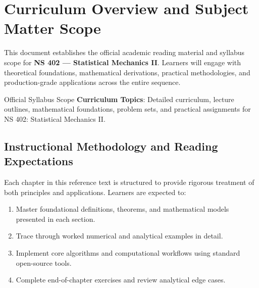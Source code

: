 \section{Curriculum Overview and Subject Matter Scope}

This document establishes the official academic reading material and syllabus scope for \textbf{NS 402 --- Statistical Mechanics II}. Learners will engage with theoretical foundations, mathematical derivations, practical methodologies, and production-grade applications across the entire sequence.

\begin{InsightBox}{Official Syllabus Scope}
  \textbf{Curriculum Topics}: Detailed curriculum, lecture outlines, mathematical foundations, problem sets, and practical assignments for NS 402: Statistical Mechanics II.
\end{InsightBox}

\subsection{Instructional Methodology and Reading Expectations}

Each chapter in this reference text is structured to provide rigorous treatment of both principles and applications. Learners are expected to:
\begin{enumerate}
  \item Master foundational definitions, theorems, and mathematical models presented in each section.
  \item Trace through worked numerical and analytical examples in detail.
  \item Implement core algorithms and computational workflows using standard open-source tools.
  \item Complete end-of-chapter exercises and review analytical edge cases.
\end{enumerate}

